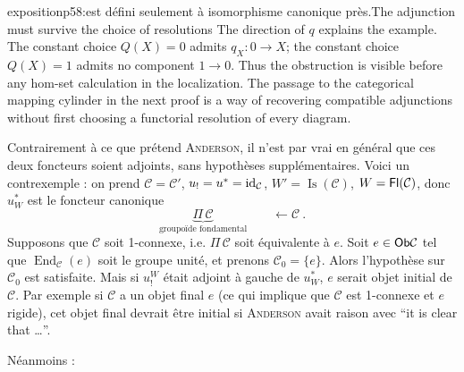 \begin{dcomment}{exposition}{p58:est défini seulement à isomorphisme canonique près.}{The adjunction must survive the choice of resolutions}
The direction of $q$ explains the example. The constant choice $Q(X)=0$ admits $q_X:0\to X$; the constant choice $Q(X)=1$ admits no component $1\to0$. Thus the obstruction is visible before any hom-set calculation in the localization. The passage to the categorical mapping cylinder in the next proof is a way of recovering compatible adjunctions without first choosing a functorial resolution of every diagram.
\end{dcomment}


Contrairement à ce que prétend \textsc{Anderson}, il n'est par vrai en général que ces deux %
foncteurs soient adjoints, sans hypothèses supplémentaires. Voici un contrexemple : on prend $\mathcal{C} = \mathcal{C}'$, $u_! = u^* = \mathrm{id}_{\mathcal{C}}$, $W' = \operatorname{Is}(\mathcal{C})$, $W = \mathsf{Fl}(\mathcal{C})$, donc $u_W^*$ est le foncteur canonique
\[
\underbrace{\Pi\,\mathcal{C}}_{\text{groupoïde fondamental}} \qquad \longleftarrow \mathcal{C}\ .
\]
Supposons que $\mathcal{C}$ soit 1-connexe, i.e. $\Pi\,\mathcal{C}$ soit équivalente à $e$. Soit $e\in\mathsf{Ob}\mathcal{C}$ tel que $\operatorname{End}_{\mathcal{C}}(e)$ soit le groupe unité, et prenons $\mathcal{C}_0 = \{e\}$. Alors l'hypothèse sur $\mathcal{C}_0$ est satisfaite. Mais si $u_!^W$ était adjoint à gauche de $u_W^*$, $e$ serait objet initial de $\mathcal{C}$. Par exemple si $\mathcal{C}$ a un objet final $e$ (ce qui implique que $\mathcal{C}$ est 1-connexe et $e$ rigide), cet objet final devrait être initial si \textsc{Anderson} avait raison avec “it is clear that \ldots”.

Néanmoins :

